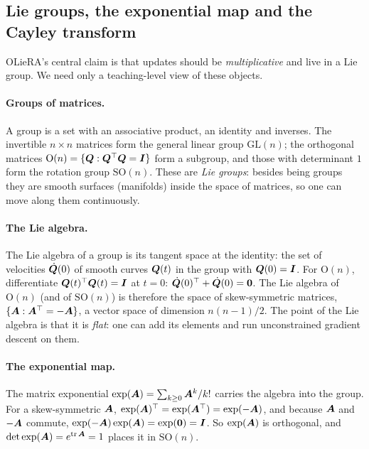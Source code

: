 \subsection{Lie groups, the exponential map and the Cayley transform}\label{sec:c11-lie}

OLieRA's central claim is that updates should be \emph{multiplicative} and live in a Lie group. We
need only a teaching-level view of these objects.

\paragraph{Groups of matrices.} A group is a set with an associative product, an identity and
inverses. The invertible $n\times n$ matrices form the general linear group $\mathrm{GL}(n)$; the
orthogonal matrices $\mathrm{O}(n) = \{\bm{Q} : \bm{Q}^{\top}\bm{Q} = \bm{I}\}$ form a subgroup, and those with
determinant $1$ form the rotation group $\mathrm{SO}(n)$. These are \emph{Lie groups}: besides
being groups they are smooth surfaces (manifolds) inside the space of matrices, so one can move
along them continuously.

\paragraph{The Lie algebra.} The Lie algebra of a group is its tangent space at the identity: the
set of velocities $\dot{\bm{Q}}(0)$ of smooth curves $\bm{Q}(t)$ in the group with $\bm{Q}(0) = \bm{I}$. For
$\mathrm{O}(n)$, differentiate $\bm{Q}(t)^{\top}\bm{Q}(t) = \bm{I}$ at $t=0$:
$\dot{\bm{Q}}(0)^{\top} + \dot{\bm{Q}}(0) = \bm{0}$. The Lie algebra of $\mathrm{O}(n)$ (and of $\mathrm{SO}(n)$)
is therefore the space of skew-symmetric matrices, $\{\bm{A} : \bm{A}^{\top} = -\bm{A}\}$, a vector space of
dimension $n(n-1)/2$. The point of the Lie algebra is that it is \emph{flat}: one can add its
elements and run unconstrained gradient descent on them.

\paragraph{The exponential map.} The matrix exponential
$\exp(\bm{A}) = \sum_{k\ge0}\bm{A}^k/k!$ carries the algebra into the group. For a skew-symmetric
$\bm{A}$, $\exp(\bm{A})^{\top} = \exp(\bm{A}^{\top}) = \exp(-\bm{A})$, and because $\bm{A}$ and $-\bm{A}$ commute,
$\exp(-\bm{A})\exp(\bm{A}) = \exp(\bm{0}) = \bm{I}$. So $\exp(\bm{A})$ is orthogonal, and
$\det\exp(\bm{A}) = e^{\operatorname{tr}\bm{A}} = 1$ places it in $\mathrm{SO}(n)$.

